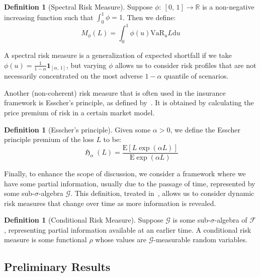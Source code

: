\documentclass{amsart}
\theoremstyle{plain}
\theoremstyle{definition}
\newtheorem{definition}[subsubsection]{Definition}
\theoremstyle{definition}
\theoremstyle{remark}
\DeclareMathOperator{\esscher}{\mathfrak{H}}
\begin{document}
\begin{definition}[Spectral Risk Measure]
    Suppose \(\phi:\ \left[0,\,1\right] \rightarrow \mathbb{R}\) is a non-negative increasing function such that \(\int_{0}^{1} \phi = 1\). Then we define:
    \begin{equation*}
        M_{\phi}\left(L\right) = \int_{0}^{1} \phi \left(u\right) \text{VaR}_{u} L \mathrm{d}u
    \end{equation*}
\end{definition}
A spectral risk measure is a generalization of expected shortfall if we take \(\phi \left(u\right) = \frac{1}{1-\alpha}\mathbf{1}_{\left[\alpha,\,1\right]}\), but varying \(\phi\) allows us to consider risk profiles that are not necessarily concentrated on the most adverse \(1-\alpha\) quantile of scenarios.

Another (non-coherent) risk measure that is often used in the insurance framework is Esscher's principle, as defined by~\cite{A:bühlmann-1980}. It is obtained by calculating the price premium of risk in a certain market model.
\begin{definition}[Esscher's principle]
   Given some \(\alpha > 0\), we define the Esscher principle premium of the loss \(L\) to be:
   \begin{equation*}
       \esscher_{\alpha} \left(L\right) = \frac{\mathrm{E}\left[L \exp \left(\alpha L \right)\right]}{\mathrm{E} \exp \left( \alpha L\right)}
   \end{equation*}
\end{definition}

Finally, to enhance the scope of discussion, we consider a framework where we have some partial information, usually due to the passage of time, represented by some sub-\(\sigma\)-algebra \(\mathcal{G}\). This definition, treated in~\cite{A:detlefsen-et-al-2005}, allows us to consider dynamic risk measures that change over time as more information is revealed.
\begin{definition}[Conditional Risk Measure]
    Suppose \(\mathcal{G}\) is some sub-\(\sigma\)-algebra of \(\mathcal{F}\), representing partial information available at an earlier time. A conditional risk measure is some functional \(\rho\) whose values are \(\mathcal{G}\)-measurable random variables.
\end{definition}

\subsection{Preliminary Results}
\end{document}
